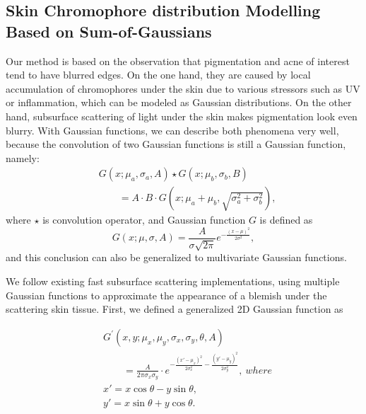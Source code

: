 \begin{spacing}{1.5}
\section{Skin Chromophore distribution Modelling Based on Sum-of-Gaussians}
Our method is based on the observation that pigmentation and acne of interest tend to have blurred edges. On the one hand, they are caused by local accumulation of chromophores under the skin due to various stressors such as UV or inflammation, which can be modeled as Gaussian distributions. On the other hand, subsurface scattering of light under the skin makes pigmentation look even blurry. With Gaussian functions, we can describe both phenomena very well, because the convolution of two Gaussian functions is still a Gaussian function, namely:
\begin{equation}
    \begin{aligned}
         & G(x; \mu_a, \sigma_a, A)\star G(x; \mu_b, \sigma_b, B)                 \\
         & \qquad= A\cdot B\cdot G(x; \mu_a+\mu_b, \sqrt{\sigma_a^2+\sigma_b^2}),
    \end{aligned}
\end{equation}
where $\star$ is convolution operator, and Gaussian function $G$ is defined as
\begin{equation}
    G(x; \mu, \sigma, A) = \frac{A}{\sigma\sqrt{2\pi}}e^{-\frac{{(x - \mu)^2}}{{2\sigma^2}}},
\end{equation}
and this conclusion can also be generalized to multivariate Gaussian functions.

We follow existing fast subsurface scattering implementations, using multiple Gaussian functions to approximate the appearance of a blemish under the scattering skin tissue. First, we defined a generalized 2D Gaussian function as

\begin{equation}
    \begin{aligned}
         & G^\prime(x, y; \mu_x, \mu_y, \sigma_x, \sigma_y, \theta, A)                                                                                 \\
         & \qquad=\frac{A}{2\pi \sigma_x \sigma_y}\cdot e^{-\frac{{(x' - \mu_x)^2}}{{2 \sigma_x^2}} - \frac{{(y' - \mu_y)^2}}{{2 \sigma_y^2}}},\ where \\
         & x' = x \cos\theta - y \sin\theta,                                                                                                           \\
         & y' = x \sin\theta + y \cos\theta.
    \end{aligned}
\end{equation}


\end{spacing}
